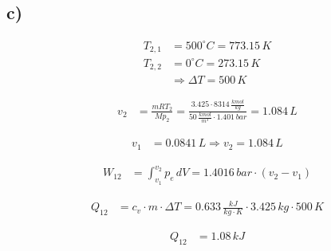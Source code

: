 

\subsection*{c)}

\begin{align*}
T_{2,1} &= 500^\circ C = 773.15\,K \\
T_{2,2} &= 0^\circ C = 273.15\,K \\
&\Rightarrow \Delta T = 500\,K
\end{align*}

\begin{align*}
v_2 &= \frac{mRT_2}{M p_2} = \frac{3.425 \cdot 8314 \, \frac{kmol}{kg}}{50 \, \frac{kmol}{m^3} \cdot 1.401 \, bar} = 1.084\,L
\end{align*}

\begin{align*}
v_1 &= 0.0841\,L \Rightarrow v_2 = 1.084\,L
\end{align*}

\begin{align*}
W_{12} &= \int_{v_1}^{v_2} p_e \, dV = 1.4016\,bar \cdot (v_2 - v_1)
\end{align*}

\begin{align*}
Q_{12} &= c_v \cdot m \cdot \Delta T = 0.633 \, \frac{kJ}{kg \cdot K} \cdot 3.425 \, kg \cdot 500\,K
\end{align*}

\begin{align*}
Q_{12} &= 1.08\,kJ
\end{align*}